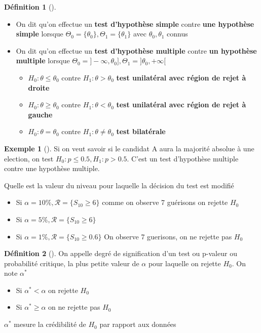 \documentclass{article}
\theoremstyle{plain}%
\theoremstyle{definition}
\newtheorem{defn}{Définition}[section]
\newtheorem{exmp}{Exemple}[section]
\theoremstyle{remark}
\begin{document}
    \begin{defn}[]
        \begin{itemize}
            \item On dit qu'on effectue un \textbf{test d'hypothèse simple} contre \textbf{une hypothèse simple} lorsque $ \Theta _0 = \{\theta _0\}, \Theta _1 = \{\theta _1\} $ avec $ \theta _0, \theta _1 $ connus
            \item On dit qu'on effectue un \textbf{test d'hypothèse multiple} contre \textbf{un hypothèse multiple} lorsque $ \Theta _0 = ]-\infty , \theta _0], \Theta _1 = ]\theta _0, +\infty [$ \begin{itemize}
                \item $ H_0: \theta \leq \theta _0 $ contre $ H_1 : \theta > \theta _0 $ \textbf{test unilatéral avec région de rejet à droite}
                \item $ H_0: \theta \geq \theta _0 $ contre $ H_1 : \theta < \theta _0 $ \textbf{test unilatéral avec région de rejet à gauche}
                \item $ H_0: \theta = \theta _0 $ contre $ H_1 : \theta \neq  \theta _0 $ \textbf{test bilatérale}
            \end{itemize}
        \end{itemize}
    \end{defn}
    \begin{exmp}[]
        Si on veut savoir si le candidat A aura la majorité absolue à une election, on test $ H_0: p \leq 0.5, H_1: p >0.5$. C'est un test d'hypothèse multiple contre une hypothèse multiple.
    \end{exmp}
    
    Quelle est la valeur du niveau pour laquelle la décision du test est modifié \begin{itemize}
        \item Si $ \alpha =10\%, \mathcal{R}=\{S_{10} \geq 6\}$ comme on observe 7 guérisons on rejette $ H_0 $ 
        \item Si $ \alpha =5\%, \mathcal{R}=\{S_{10} \geq 6\}$ 
        \item Si $ \alpha =1\%, \mathcal{R}=\{S_{10} \geq 0.6\}$ On observe 7 guerisons, on ne rejette pas $ H_0 $ 
    \end{itemize}
    \begin{defn}[]
        On appelle degré de signification d'un test ou p-valeur ou probabilité critique, la plus petite valeur de $ \alpha  $ pour laquelle on rejette $ H_0 $. On note $ \alpha ^* $ \begin{itemize}
            \item Si $ \alpha ^* < \alpha  $ on rejette $ H_0 $ 
            \item Si $ \alpha ^* \geq \alpha  $ on ne rejette pas $ H_0 $ 
        \end{itemize}
        $ \alpha ^* $ mesure la crédibilité de $ H_0 $ par rapport aux données
    \end{defn}
\end{document}

